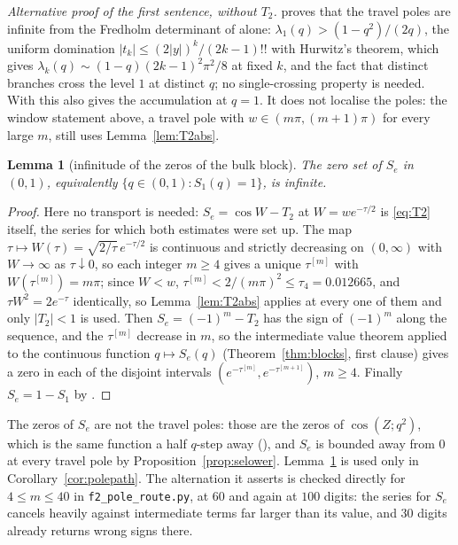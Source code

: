 \documentclass[11pt]{article}
\theoremstyle{plain}
\newtheorem{lemma}[theorem]{Lemma}
\theoremstyle{definition}
\theoremstyle{remark}
\begin{document}
\emph{Alternative proof of the first sentence, without $T_2$.} {\cite[Proposition ``infinitely many travel poles, without $T_2$'', \textup{prop:infpolesalt}]{Bonfioli2026bA}}
proves that the travel poles are infinite from the Fredholm determinant of
{\cite[Theorem ``the travel determinant'', \textup{thm:fredholm}]{Bonfioli2026bA}} alone: $\lambda_1(q)>(1-q^2)/(2q)$, the uniform domination
$|t_k|\le(2|y|)^k/(2k-1)!!$ with Hurwitz's theorem, which gives
$\lambda_k(q)\sim(1-q)(2k-1)^2\pi^2/8$ at fixed $k$, and the fact that distinct branches cross the
level $1$ at distinct $q$; no single-crossing property is needed. With {\cite[Lemma ``The travel poles are locally finite'', \textup{lem:polefinite}]{Bonfioli2026bA}}
this also gives the accumulation at $q=1$. It does not localise the poles: the window statement
above, a travel pole with $w\in(m\pi,(m+1)\pi)$ for every large $m$, still uses
Lemma~\ref{lem:T2abs}.

\begin{lemma}[infinitude of the zeros of the bulk block]\label{lem:infzeros}
The zero set of $S_e$ in $(0,1)$, equivalently $\{q\in(0,1):S_1(q)=1\}$, is infinite.
\end{lemma}

\begin{proof}
Here no transport is needed: $S_e=\cos W-T_2$ at $W=we^{-\tau/2}$ is \eqref{eq:T2} itself, the
series for which both estimates were set up. The map
$\tau\mapsto W(\tau)=\sqrt{2/\tau}\,e^{-\tau/2}$ is continuous and strictly decreasing on
$(0,\infty)$ with $W\to\infty$ as $\tau\downarrow0$, so each integer $m\ge4$ gives a unique
$\tau^{[m]}$ with $W(\tau^{[m]})=m\pi$; since $W<w$, $\tau^{[m]}<2/(m\pi)^2\le\tau_4=0.012665$, and
$\tau W^2=2e^{-\tau}$ identically, so Lemma~\ref{lem:T2abs} applies at every one of them and only
$|T_2|<1$ is used. Then $S_e=(-1)^m-T_2$ has the sign of $(-1)^m$ along the sequence, and the
$\tau^{[m]}$ decrease in $m$, so the intermediate value theorem applied to the continuous function
$q\mapsto S_e(q)$ (Theorem~\ref{thm:blocks}, first clause) gives a zero in each of the disjoint
intervals $(e^{-\tau^{[m]}},e^{-\tau^{[m+1]}})$, $m\ge4$. Finally $S_e=1-S_1$ by
{\cite[Proposition \textup{prop:qtrig}]{Bonfioli2026bA}}.
\end{proof}

\noindent The zeros of $S_e$ are not the travel poles: those are the zeros of $\cos(Z;q^2)$, which
is the same function a half $q$-step away ({\cite[Proposition \textup{prop:qtrig}]{Bonfioli2026bA}}), and $S_e$ is bounded away
from $0$ at every travel pole by Proposition~\ref{prop:selower}. Lemma~\ref{lem:infzeros} is used
only in Corollary~\ref{cor:polepath}. The alternation it asserts is checked directly for
$4\le m\le40$ in \texttt{f2\_pole\_route.py}, at $60$ and again at $100$ digits: the series for
$S_e$ cancels heavily against intermediate terms far larger than its value, and $30$ digits already
returns wrong signs there.
\end{document}
